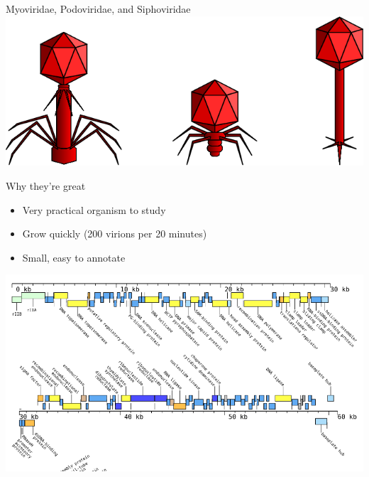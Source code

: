\documentclass[12pt]{beamer}
\begin{document}
\begin{frame}{Myoviridae, Podoviridae, and Siphoviridae}
    \centering
    \includegraphics[width=\textwidth]{./Caudovirales.png}
\end{frame}

\begin{frame}{Why they're great}
    \begin{itemize}
        \item Very practical organism to study
       \item Grow quickly (200 virions per 20 minutes)
        \item Small, easy to annotate
    \end{itemize}
    \centering
    \includegraphics[height=.5\textheight]{./annotation.png}
\end{frame}
\end{document}
